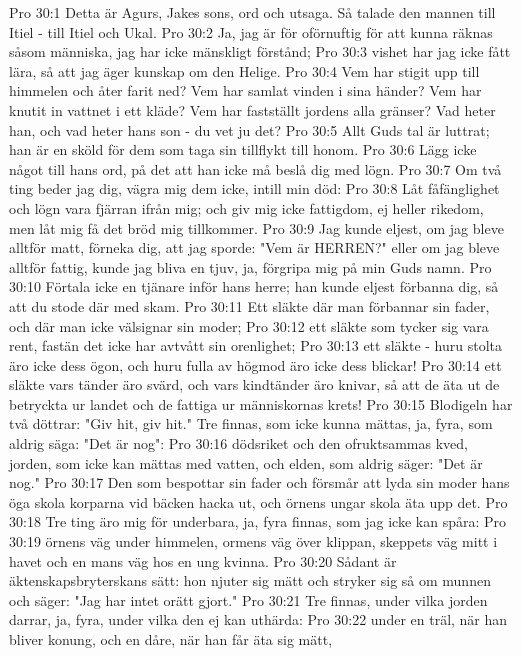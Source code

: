 Pro 30:1  Detta är Agurs, Jakes sons, ord och utsaga. Så talade den mannen till Itiel - till Itiel och Ukal.
Pro 30:2  Ja, jag är för oförnuftig för att kunna räknas såsom människa, jag har icke mänskligt förstånd;
Pro 30:3  vishet har jag icke fått lära, så att jag äger kunskap om den Helige.
Pro 30:4  Vem har stigit upp till himmelen och åter farit ned? Vem har samlat vinden i sina händer? Vem har knutit in vattnet i ett kläde? Vem har fastställt jordens alla gränser? Vad heter han, och vad heter hans son - du vet ju det?
Pro 30:5  Allt Guds tal är luttrat; han är en sköld för dem som taga sin tillflykt till honom.
Pro 30:6  Lägg icke något till hans ord, på det att han icke må beslå dig med lögn.
Pro 30:7  Om två ting beder jag dig, vägra mig dem icke, intill min död:
Pro 30:8  Låt fåfänglighet och lögn vara fjärran ifrån mig; och giv mig icke fattigdom, ej heller rikedom, men låt mig få det bröd mig tillkommer.
Pro 30:9  Jag kunde eljest, om jag bleve alltför matt, förneka dig, att jag sporde: "Vem är HERREN?" eller om jag bleve alltför fattig, kunde jag bliva en tjuv, ja, förgripa mig på min Guds namn.
Pro 30:10  Förtala icke en tjänare inför hans herre; han kunde eljest förbanna dig, så att du stode där med skam.
Pro 30:11  Ett släkte där man förbannar sin fader, och där man icke välsignar sin moder;
Pro 30:12  ett släkte som tycker sig vara rent, fastän det icke har avtvått sin orenlighet;
Pro 30:13  ett släkte - huru stolta äro icke dess ögon, och huru fulla av högmod äro icke dess blickar!
Pro 30:14  ett släkte vars tänder äro svärd, och vars kindtänder äro knivar, så att de äta ut de betryckta ur landet och de fattiga ur människornas krets!
Pro 30:15  Blodigeln har två döttrar: "Giv hit, giv hit." Tre finnas, som icke kunna mättas, ja, fyra, som aldrig säga: "Det är nog":
Pro 30:16  dödsriket och den ofruktsammas kved, jorden, som icke kan mättas med vatten, och elden, som aldrig säger: "Det är nog."
Pro 30:17  Den som bespottar sin fader och försmår att lyda sin moder hans öga skola korparna vid bäcken hacka ut, och örnens ungar skola äta upp det.
Pro 30:18  Tre ting äro mig för underbara, ja, fyra finnas, som jag icke kan spåra:
Pro 30:19  örnens väg under himmelen, ormens väg över klippan, skeppets väg mitt i havet och en mans väg hos en ung kvinna.
Pro 30:20  Sådant är äktenskapsbryterskans sätt: hon njuter sig mätt och stryker sig så om munnen och säger: "Jag har intet orätt gjort."
Pro 30:21  Tre finnas, under vilka jorden darrar, ja, fyra, under vilka den ej kan uthärda:
Pro 30:22  under en träl, när han bliver konung, och en dåre, när han får äta sig mätt,
